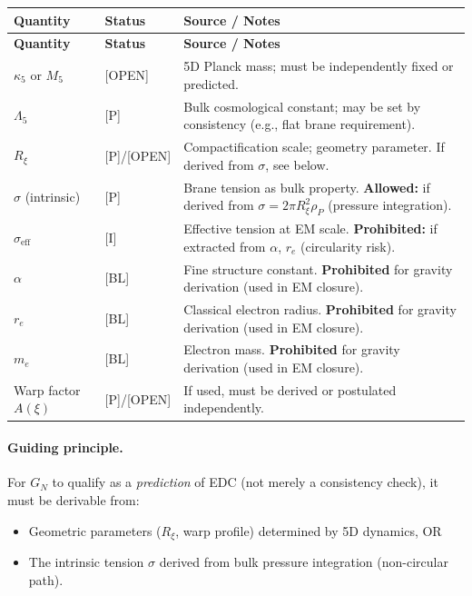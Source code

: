 \documentclass[11pt,a4paper]{article}
\newcommand{\tagBL}{\textcolor{blue!70!black}{[BL]}}
\newcommand{\tagI}{\textcolor{green!50!black}{[I]}}
\newcommand{\tagP}{\textcolor{orange!80!black}{[P]}}
\newcommand{\tagOPEN}{\textcolor{red!70!black}{[OPEN]}}
\begin{document}
\begin{center}
\renewcommand{\arraystretch}{1.3}
\begin{longtable}{p{2.5cm}p{2cm}p{7cm}}
\toprule
\textbf{Quantity} & \textbf{Status} & \textbf{Source / Notes} \\
\midrule
\endfirsthead
\toprule
\textbf{Quantity} & \textbf{Status} & \textbf{Source / Notes} \\
\midrule
\endhead
\bottomrule
\endfoot

$\kappa_5$ or $M_5$ & \tagOPEN{} & 5D Planck mass; must be independently fixed or predicted. \\

$\Lambda_5$ & \tagP{} & Bulk cosmological constant; may be set by consistency (e.g., flat brane requirement). \\

$R_\xi$ & \tagP{}/\tagOPEN{} & Compactification scale; geometry parameter. If derived from $\sigma$, see below. \\

$\sigma$ (intrinsic) & \tagP{} & Brane tension as bulk property. \textbf{Allowed:} if derived from $\sigma = 2\pi R_\xi^2 \rho_P$ (pressure integration). \\

$\sigma_{\mathrm{eff}}$ & \tagI{} & Effective tension at EM scale. \textbf{Prohibited:} if extracted from $\alpha$, $r_e$ (circularity risk). \\

$\alpha$ & \tagBL{} & Fine structure constant. \textbf{Prohibited} for gravity derivation (used in EM closure). \\

$r_e$ & \tagBL{} & Classical electron radius. \textbf{Prohibited} for gravity derivation (used in EM closure). \\

$m_e$ & \tagBL{} & Electron mass. \textbf{Prohibited} for gravity derivation (used in EM closure). \\

Warp factor $A(\xi)$ & \tagP{}/\tagOPEN{} & If used, must be derived or postulated independently. \\

\end{longtable}
\end{center}

\paragraph{Guiding principle.}
For $G_N$ to qualify as a \emph{prediction} of EDC (not merely a consistency check), it must be derivable from:
\begin{itemize}[nosep]
    \item Geometric parameters ($R_\xi$, warp profile) determined by 5D dynamics, OR
    \item The intrinsic tension $\sigma$ derived from bulk pressure integration (non-circular path).
\end{itemize}
\end{document}
